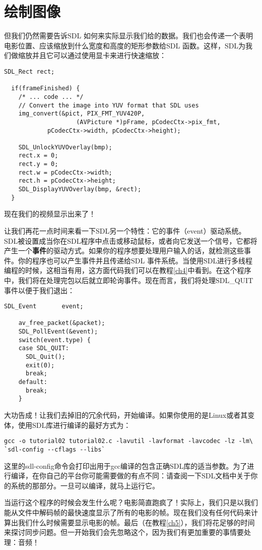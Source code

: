 \section{绘制图像}

但我们仍然需要告诉SDL 如何来实际显示我们给的数据。我们也会传递一个表明电影位置、应该缩放到什么宽度和高度的矩形参数给SDL 函数。这样，SDL为我们做缩放并且它可以通过使用显卡来进行快速缩放：

\begin{lstlisting}
SDL_Rect rect;

  if(frameFinished) {
    /* ... code ... */
    // Convert the image into YUV format that SDL uses
    img_convert(&pict, PIX_FMT_YUV420P,
                    (AVPicture *)pFrame, pCodecCtx->pix_fmt,
            pCodecCtx->width, pCodecCtx->height);

    SDL_UnlockYUVOverlay(bmp);
    rect.x = 0;
    rect.y = 0;
    rect.w = pCodecCtx->width;
    rect.h = pCodecCtx->height;
    SDL_DisplayYUVOverlay(bmp, &rect);
  }
\end{lstlisting}

现在我们的视频显示出来了！

让我们再花一点时间来看一下SDL另一个特性：它的事件（event）驱动系统。SDL被设置成当你在SDL程序中点击或移动鼠标，或者向它发送一个信号，它都将产生一个\textbf{事件}的驱动方式。如果你的程序想要处理用户输入的话，就检测这些事件。你的程序也可以产生事件并且传递给SDL 事件系统。当使用SDL进行多线程编程的时候，这相当有用，这方面代码我们可以在教程\ref{ch4}中看到。在这个程序中，我们将在处理完包以后就立即轮询事件。现在而言，我们将处理SDL_QUIT事件以便于我们退出：

\begin{lstlisting}
SDL_Event       event;

    av_free_packet(&packet);
    SDL_PollEvent(&event);
    switch(event.type) {
    case SDL_QUIT:
      SDL_Quit();
      exit(0);
      break;
    default:
      break;
    }
\end{lstlisting}

大功告成！让我们去掉旧的冗余代码，开始编译。如果你使用的是Linux或者其变体，使用SDL库进行编译的最好方式为：
\begin{lstlisting}
gcc -o tutorial02 tutorial02.c -lavutil -lavformat -lavcodec -lz -lm\
`sdl-config --cflags --libs`
\end{lstlisting}


这里的sdl-config命令会打印出用于gcc编译的包含正确SDL库的适当参数。为了进行编译，在你自己的平台你可能需要做的有点不同：请查阅一下SDL文档中关于你的系统的那部分。一旦可以编译，就马上运行它。

当运行这个程序的时候会发生什么呢？电影简直跑疯了！实际上，我们只是以我们能从文件中解码帧的最快速度显示了所有的电影的帧。现在我们没有任何代码来计算出我们什么时候需要显示电影的帧。最后（在教程\ref{ch5}），我们将花足够的时间来探讨同步问题。但一开始我们会先忽略这个，因为我们有更加重要的事情要处理：音频！
